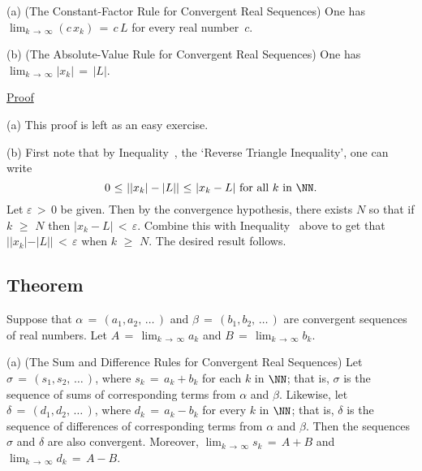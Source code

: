 \V

        (a) (The Constant-Factor Rule for Convergent Real Sequences)
    One has $\lim_{k \,{\rightarrow}\, {\infty}} (c\,x_{k}) \,=\, c\,L$ for every real number~$c$.

\V

        (b) (The Absolute-Value Rule for Convergent Real Sequences) 
    One has $\lim_{k \,{\rightarrow}\, {\infty}} |x_{k}| \,=\, |L|$.

\V


        \underline{Proof} 

\V

        (a) This proof is left as an easy exercise.

\V

        (b) First note that by Inequality~, the `Reverse Triangle Inequality', one can write
        \begin{equation} 
        \label{IneqC.60}
        0\,\,{\leq}\,\,||x_{k}|-|L||\,\,{\leq}\,\,|x_{k}-L| \mbox{ for all $k$ in ${\NN}$}.
        \end{equation}
    Let ${\varepsilon}\,>\,0$ be given. Then by the convergence hypothesis, there exists $N$
    so that if $k\,\,{\geq}\,\,N$ then $|x_{k}-L|\,<\,{\varepsilon}$. Combine this with Inequality~ above
    to get that $||x_{k}|-|L||\,<\,{\varepsilon}$ when $k\,\,{\geq}\,\,N$. The desired result follows.


\VV

            \subsection{\small{\bf Theorem}}
            \label{ThmC60.30}

        Suppose that ${\alpha} \,=\, (a_{1},a_{2},\,{\ldots}\,)$ and ${\beta} \,=\, (b_{1},b_{2},\,{\ldots}\,)$ are convergent sequences of real numbers.
    Let $A \,=\, \lim_{k \,{\rightarrow}\, {\infty}} a_{k}$ and $B \,=\, \lim_{k \,{\rightarrow}\, {\infty}} b_{k}$.


\V

        (a) (The Sum and Difference Rules for Convergent Real Sequences) Let ${\sigma} \,=\,(s_{1},s_{2},\,{\ldots}\,)$, where $s_{k} \,=\,a_{k}+b_{k}$ for each $k$ in ${\NN}$;
    that is, ${\sigma}$ is the sequence of sums of corresponding terms from ${\alpha}$ and ${\beta}$.
    Likewise, let ${\delta} \,=\, (d_{1},d_{2},\,{\ldots}\,)$, where $d_{k} \,=\, a_{k}-b_{k}$ for every $k$ in ${\NN}$;
    that is, ${\delta}$ is the sequence of differences of corresponding terms from ${\alpha}$ and ${\beta}$.
    Then the sequences ${\sigma}$ and ${\delta}$ are also convergent.
    Moreover, $\lim_{k \,{\rightarrow}\, {\infty}} s_{k} \,=\, A+B$ and $\lim_{k \,{\rightarrow}\, {\infty}} d_{k} \,=\, A-B$.



